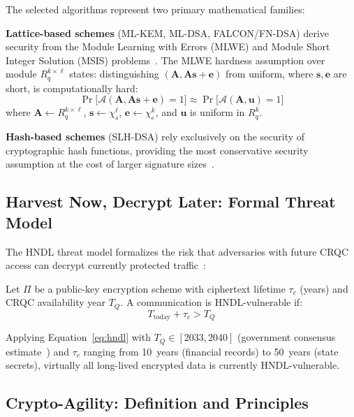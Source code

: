 \documentclass[journal]{IEEEtran}
\begin{document}
The selected algorithms represent two primary mathematical families:

\textbf{Lattice-based schemes} (ML-KEM, ML-DSA, FALCON/FN-DSA) derive security
from the Module Learning with Errors (MLWE) and Module Short Integer Solution
(MSIS) problems~\cite{peikert2009public}. The MLWE hardness assumption over
module $R_q^{k\times\ell}$ states: distinguishing
$(\mathbf{A}, \mathbf{As+e})$ from uniform, where
$\mathbf{s},\mathbf{e}$ are short, is computationally hard:
\begin{equation}
  \Pr\bigl[\mathcal{A}(\mathbf{A},\mathbf{As+e})=1\bigr] \approx
  \Pr\bigl[\mathcal{A}(\mathbf{A},\mathbf{u})=1\bigr]
  \label{eq:mlwe}
\end{equation}
where $\mathbf{A} \leftarrow R_q^{k\times\ell}$, $\mathbf{s} \leftarrow
\chi_s^{\ell}$, $\mathbf{e} \leftarrow \chi_e^k$, and $\mathbf{u}$ is
uniform in $R_q^k$.

\textbf{Hash-based schemes} (SLH-DSA) rely exclusively on the security of
cryptographic hash functions, providing the most conservative security
assumption at the cost of larger signature sizes~\cite{bernstein2019sphincs}.

\subsection{Harvest Now, Decrypt Later: Formal Threat Model}

The HNDL threat model formalizes the risk that adversaries with future CRQC
access can decrypt currently protected traffic~\cite{mosca2018cybersecurity}:

\begin{definition}
Let $\Pi$ be a public-key encryption scheme with ciphertext lifetime
$\tau_c$ (years) and CRQC availability year $T_Q$. A communication is
HNDL-vulnerable if:
\begin{equation}
  T_{\text{today}} + \tau_c > T_Q
  \label{eq:hndl}
\end{equation}
\end{definition}

Applying Equation~\eqref{eq:hndl} with $T_Q \in [2033, 2040]$ (government
consensus estimate~\cite{odni2023atr}) and $\tau_c$ ranging from 10~years
(financial records) to 50~years (state secrets), virtually all long-lived
encrypted data is currently HNDL-vulnerable.

\subsection{Crypto-Agility: Definition and Principles}
\end{document}
